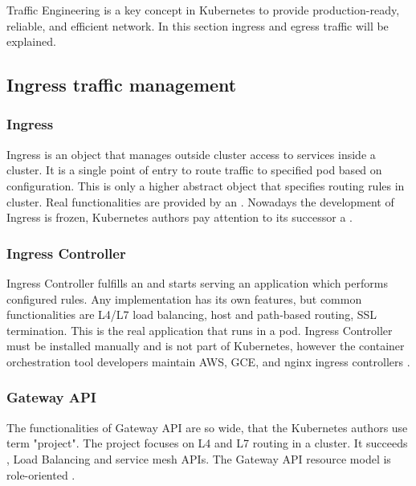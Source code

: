 Traffic Engineering is a key concept in Kubernetes to provide production-ready, reliable, and efficient network. In this section ingress and egress traffic will be explained.


\subsection{Ingress traffic management}
\label{sec:ingressTrafficMngmnt}

\subsubsection{Ingress}
\label{ingress}

Ingress is an object that manages outside cluster access to services inside a cluster. It is a single point of entry to route traffic to specified pod based on configuration. This is only a higher abstract object that specifies routing rules in cluster. Real functionalities are provided by an \textit{}. Nowadays the development of Ingress is frozen, Kubernetes authors pay attention to its successor a \textit{} \cite{KubernetesDocs}.

\subsubsection{Ingress Controller}
\label{ingresscontroller}

Ingress Controller fulfills an \textit{} and starts serving an application which performs configured rules. Any implementation has its own features, but common functionalities are L4/L7 load balancing, host and path-based routing, SSL termination. This is the real application that runs in a pod. Ingress Controller must be installed manually and is not part of Kubernetes, however the container orchestration tool developers maintain AWS, GCE, and nginx ingress controllers \cite{KubernetesDocs}. 


\subsubsection{Gateway API}
\label{gatewayapi}

The functionalities of Gateway API are so wide, that the Kubernetes authors use term "project". The project focuses on L4 and L7 routing in a cluster. It succeeds \textit{}, Load Balancing and service mesh APIs. The Gateway API resource model is role-oriented \cite{KubernetesGatewayAPI}.

